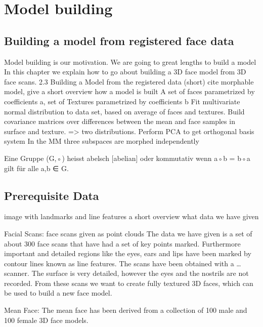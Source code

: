 \chapter{Model building}

\section{Building a model from registered face data}
Model building is our motivation. We are going to great lengths to build a model
In this chapter we explain how to go about building a 3D face model from 3D face scans.
2.3 Building a Model from the registered data (short)
cite morphable model, give a short overview how a model is built
A set of faces parametrized by coefficients a, set of Textures parametrized by coefficients b
Fit multivariate normal distribution to data set, based on average of faces and textures. Build covariance matrices over differences between the mean and face samples in surface and texture. => two distributions. Perform PCA to get orthogonal basis system
In the MM three subspaces are morphed independently

Eine Gruppe (G,◦) heisst abelsch [abelian] oder kommutativ wenn a◦b = b◦a gilt für
alle a,b ∈ G.

\section{Prerequisite Data}
image with landmarks and line features
a short overview what data we have given

Facial Scans:
face scans given as point clouds
The data we have given is a set of about 300 face scans that have had a set of key points marked. Furthermore important and detailed regions like the eyes, ears and lips have been marked by contour lines known as line features. The scans have been obtained with a … scanner. The surface is very detailed, however the eyes and the nostrils are not recorded. From these scans we want to create fully textured 3D faces, which can be used to build a new face model.

Mean Face:
The mean face has been derived from a collection of 100 male and 100 female 3D face models.


